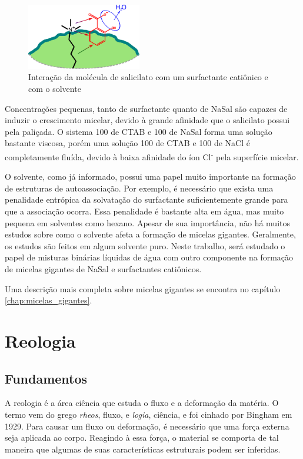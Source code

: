 	\begin{figure}[h]
		\centering
		\includegraphics[width=5cm]{imagens/introducao/interacao_nasal_ctab}
		\caption{Interação da molécula de salicilato com um surfactante catiônico e com o solvente}
		\label{fig:interacao_nasal_ctab} 
	\end{figure}
	
	Concentrações pequenas, tanto de surfactante quanto de NaSal são capazes de induzir o crescimento micelar, devido à grande afinidade que o salicilato possui pela paliçada. O sistema 100 \mM{} de CTAB e 100 \mM{} de NaSal forma uma solução bastante viscosa, porém uma solução 100 \mM{} de CTAB e 100 \mM{} de NaCl é completamente fluída, devido à baixa afinidade do íon Cl\textsuperscript{-} pela superfície micelar. 
	
	O solvente, como já informado, possui uma papel muito importante na formação de estruturas de autoassociação. Por exemplo, é necessário que exista uma penalidade entrópica da solvatação do surfactante suficientemente grande para que a associação ocorra. Essa penalidade é bastante alta em água, mas muito pequena em solventes como hexano. Apesar de sua importância, não há muitos estudos sobre como o solvente afeta a formação de micelas gigantes. Geralmente, os estudos são feitos em algum solvente puro. Neste trabalho, será estudado o papel de misturas binárias líquidas de água com outro componente na formação de micelas gigantes de NaSal e surfactantes catiônicos.
		
	Uma descrição mais completa sobre micelas gigantes se encontra no capítulo \ref{chap:micelas_gigantes}.

	\chapter{Reologia}
		\section{Fundamentos} 
		
		A reologia é a área ciência que estuda o fluxo e a deformação da matéria. O termo vem do grego \emph{rheos}, fluxo, e \emph{logia}, ciência, e foi cinhado por Bingham em 1929. Para causar um fluxo ou deformação, é necessário que uma força externa seja aplicada ao corpo. Reagindo à essa força, o material se comporta de tal maneira que algumas de suas características estruturais podem ser inferidas. %
		
